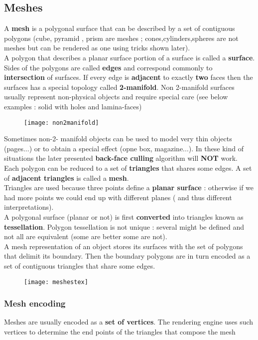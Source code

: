 \subsection{Meshes}
A \textbf{mesh} is a polygonal surface that can be described by a set of contiguous polygons (cube, pyramid , prism are meshes ; cones,cylinders,spheres are not meshes but can be rendered as one using tricks shown later).\\
A polygon that describes a planar surface  portion of a surface is called a \textbf{surface}.\\
Sides of the polygons are called \textbf{edges} and correspond commonly to \textbf{intersection} of surfaces.\newpage
If every edge is \textbf{adjacent} to exactly \textbf{two} faces then the surfaces has a special topology called \textbf{2-manifold}.
Non 2-manifold surfaces usually represent non-physical objects and require special care (see below examples : solid with holes and lamina-faces)
\begin{figure}[H]
  \centering
  \texttt{[image: non2manifold]}
\end{figure}
Sometimes non-2- manifold objects can be used to model very thin objects (pages...) or to obtain a special effect (opne box, magazine...). In these kind of situations the later presented \textbf{back-face culling} algorithm will \textbf{NOT} work.\\
Each polygon	 can be reduced to a set of \textbf{triangles} that shares some edges. A set of \textbf{adjacent triangles} is called a \textbf{mesh}.\\
Triangles are used because three points define a \textbf{planar surface} : otherwise if we had more points we could end up with different planes ( and thus different interpretations).\\
A polygonal surface (planar or not) is first \textbf{converted} into triangles known as \textbf{tessellation}. Polygon tessellation is not unique : several might be defined and not all are equivalent (some are better some are not).\\
A mesh representation of an object stores its surfaces with the set of polygons that delimit its boundary. Then the boundary polygons are in turn encoded as a set of contiguous triangles that share some edges.
\begin{figure}[H]
  \centering
  \texttt{[image: meshestex]}
\end{figure}

\subsubsection{Mesh encoding}
Meshes are usually encoded as a \textbf{set of vertices}. The rendering engine uses such vertices to determine the end points of the triangles that compose the mesh

